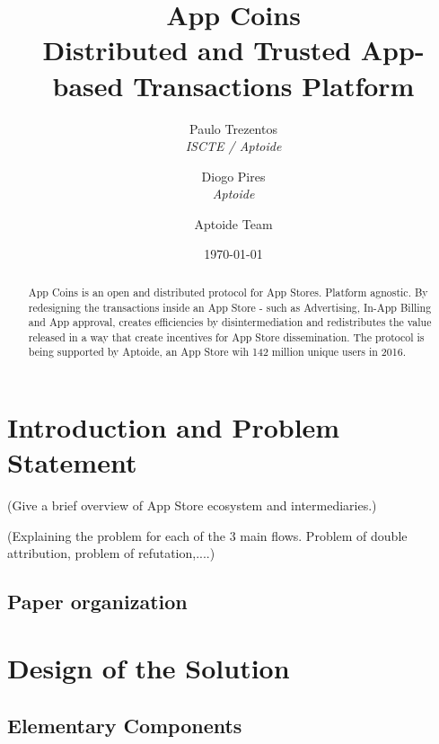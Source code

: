 \documentclass[12pt, a4paper, twoside, titlepage]{article}
\title{App Coins \\ Distributed and Trusted App-based Transactions Platform}
\author{Paulo Trezentos  \\
  {\em ISCTE / Aptoide}  \\
  \and 
  Diogo Pires \\
  {\em Aptoide} \\
  \and
  Aptoide Team
  }
\date{\today}
\begin{document}
\maketitle

\tableofcontents

\begin{abstract}
App Coins is an open and distributed protocol for App Stores. Platform agnostic. 
By redesigning the transactions inside an App Store - such as Advertising, In-App Billing and App approval, creates efficiencies by disintermediation and redistributes the value released in a way that create incentives for App Store dissemination.
The protocol is being supported by Aptoide, an App Store wih 142 million unique users in 2016. 
\end{abstract}




\section{Introduction and Problem Statement}

(Give a brief overview of App Store ecosystem and intermediaries.) 

(Explaining the problem for each of the 3 main flows. Problem of double attribution, problem of refutation,....)

\subsection{Paper organization}

\section{Design of the Solution}

\subsection{Elementary Components}
\end{document}
